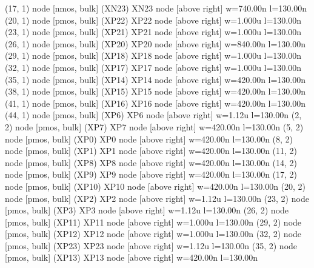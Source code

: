 \begin{circuitikz}[american]
	(17, 1) node [nmos, bulk] (XN23) {XN23} node [above right] {\tiny {w=740.00n l=130.00n}}
	(20, 1) node [pmos, bulk] (XP22) {XP22} node [above right] {\tiny {w=1.000u l=130.00n}}
	(23, 1) node [pmos, bulk] (XP21) {XP21} node [above right] {\tiny {w=1.000u l=130.00n}}
	(26, 1) node [pmos, bulk] (XP20) {XP20} node [above right] {\tiny {w=840.00n l=130.00n}}
	(29, 1) node [pmos, bulk] (XP18) {XP18} node [above right] {\tiny {w=1.000u l=130.00n}}
	(32, 1) node [pmos, bulk] (XP17) {XP17} node [above right] {\tiny {w=1.000u l=130.00n}}
	(35, 1) node [pmos, bulk] (XP14) {XP14} node [above right] {\tiny {w=420.00n l=130.00n}}
	(38, 1) node [pmos, bulk] (XP15) {XP15} node [above right] {\tiny {w=420.00n l=130.00n}}
	(41, 1) node [pmos, bulk] (XP16) {XP16} node [above right] {\tiny {w=420.00n l=130.00n}}
	(44, 1) node [pmos, bulk] (XP6) {XP6} node [above right] {\tiny {w=1.12u l=130.00n}}
	(2, 2) node [pmos, bulk] (XP7) {XP7} node [above right] {\tiny {w=420.00n l=130.00n}}
	(5, 2) node [pmos, bulk] (XP0) {XP0} node [above right] {\tiny {w=420.00n l=130.00n}}
	(8, 2) node [pmos, bulk] (XP1) {XP1} node [above right] {\tiny {w=420.00n l=130.00n}}
	(11, 2) node [pmos, bulk] (XP8) {XP8} node [above right] {\tiny {w=420.00n l=130.00n}}
	(14, 2) node [pmos, bulk] (XP9) {XP9} node [above right] {\tiny {w=420.00n l=130.00n}}
	(17, 2) node [pmos, bulk] (XP10) {XP10} node [above right] {\tiny {w=420.00n l=130.00n}}
	(20, 2) node [pmos, bulk] (XP2) {XP2} node [above right] {\tiny {w=1.12u l=130.00n}}
	(23, 2) node [pmos, bulk] (XP3) {XP3} node [above right] {\tiny {w=1.12u l=130.00n}}
	(26, 2) node [pmos, bulk] (XP11) {XP11} node [above right] {\tiny {w=1.000u l=130.00n}}
	(29, 2) node [pmos, bulk] (XP12) {XP12} node [above right] {\tiny {w=1.000u l=130.00n}}
	(32, 2) node [pmos, bulk] (XP23) {XP23} node [above right] {\tiny {w=1.12u l=130.00n}}
	(35, 2) node [pmos, bulk] (XP13) {XP13} node [above right] {\tiny {w=420.00n l=130.00n}}



\end{circuitikz}
